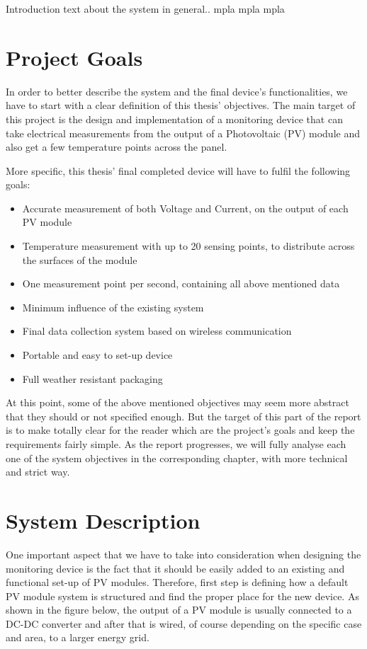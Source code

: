 Introduction text about the system in general..
mpla mpla mpla

\section{Project Goals}
In order to better describe the system and the final device's functionalities, we have to start with a clear definition of this thesis' objectives. The main target of this project is  the design and implementation of a monitoring device that can take electrical measurements from the output of a Photovoltaic (PV) module and also get a few temperature points across the panel.\par
More specific, this thesis' final completed device will have to fulfil the following goals:

\begin{itemize}
  \item Accurate measurement of both Voltage and Current, on the output of each PV module
  \item Temperature measurement with up to 20 sensing points, to distribute across the surfaces of the module
  \item One measurement point per second, containing all above mentioned data
  \item Minimum influence of the existing system
  \item Final data collection system based on wireless communication
  \item Portable and easy to set-up device
  \item Full weather resistant packaging
\end{itemize}

At this point, some of the above mentioned objectives may seem more abstract that they should or not specified enough. But the target of this part of the report is to make totally clear for the reader which are the project's goals and keep the requirements fairly simple. As the report progresses, we will fully analyse each one of the system objectives in the corresponding chapter, with more technical and strict way.

\section{System Description}
 One important aspect that we have to take into consideration when designing the monitoring device is the fact that it should be easily added to an existing and functional set-up of PV modules. Therefore, first step is defining how a default PV module system is structured and find the proper place for the new device. As shown in the figure below, the output of a PV module is usually connected to a DC-DC converter and after that is wired, of course depending on the specific case and area, to a larger energy grid.
 
